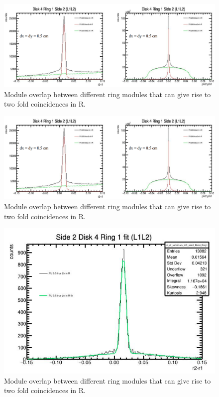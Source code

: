 \begin{figure}[!htp]
\centering
\includegraphics[width=1\textwidth]{ashish_thesis/l1l2_drdphi_2xinr_PU200.png}
\caption{%
   Module overlap between different ring modules that can give rise to two fold coincidences in R.
}
\label{fig:cluster_ring}
\end{figure}


\begin{figure}[!htp]
\centering
\includegraphics[width=1\textwidth]{ashish_thesis/l1l2_drdphi_2xinr_PU200.png}
\caption{%
   Module overlap between different ring modules that can give rise to two fold coincidences in R.
}
\label{fig:cluster_ring}
\end{figure}



\begin{figure}[!htp]
\centering
\includegraphics[width=1\textwidth]{ashish_thesis/fit_l1l2_dr_2xinr.png}
\caption{%
   Module overlap between different ring modules that can give rise to two fold coincidences in R.
}
\label{fig:cluster_ring}
\end{figure}



